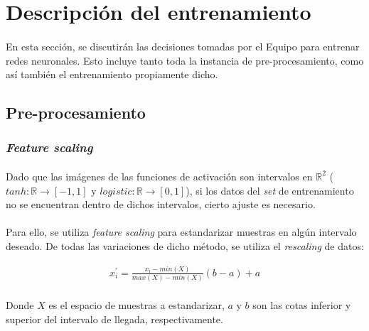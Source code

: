 \documentclass[12pt, twocolumn]{article}
\begin{document}
	\section{Descripción del entrenamiento}
	
	\paragraph{} En esta sección, se discutirán las decisiones tomadas por el Equipo para entrenar redes neuronales. Esto incluye tanto toda la instancia de pre-procesamiento, como así también el entrenamiento propiamente dicho. 
	
	\subsection{Pre-procesamiento}
	
	\subsubsection{\textit{Feature scaling}}
	
	\paragraph{} Dado que las imágenes de las funciones de activación son intervalos en $\mathbb{R}^{2}$ ($tanh : \mathbb{R} \to \left[-1, 1\right]$ y $logistic : \mathbb{R} \to \left[0, 1\right]$), si los datos del \textit{set} de entrenamiento no se encuentran dentro de dichos intervalos, cierto ajuste es necesario.
	
	\paragraph{} Para ello, se utiliza \textit{feature scaling} para estandarizar muestras en algún intervalo deseado. De todas las variaciones de dicho método, se utiliza el \textit{rescaling} de datos:
	
	\begin{align}
		x_{i}^{'} = \frac{x_{i}-min(X)}{max(X)-min(X)}(b-a)+a
	\end{align}
	
	\paragraph{} Donde $X$ es el espacio de muestras a estandarizar, $a$ y $b$ son las cotas inferior y superior del intervalo de llegada, respectivamente. 
	
\end{document}
